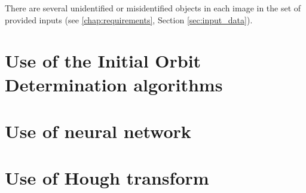 	There are several unidentified or misidentified objects in each image in the set of provided inputs (see \ref{chap:requirements}, Section \ref{sec:input_data}). 

\section{Use of the Initial Orbit Determination algorithms}\label{sec:IDO}

\section{Use of neural network}\label{sec:neural}

\section{Use of Hough transform}\label{sec:hough}